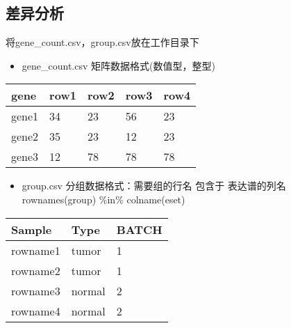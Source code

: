 \documentclass[
]{book}
\providecommand{\tightlist}{%
  \setlength{\itemsep}{0pt}\setlength{\parskip}{0pt}}
\begin{document}
\hypertarget{ux5deeux5f02ux5206ux6790}{%
\subsection{差异分析}\label{ux5deeux5f02ux5206ux6790}}

将gene\_count.csv，group.csv放在工作目录下

\begin{itemize}
\tightlist
\item
  gene\_count.csv 矩阵数据格式(数值型，整型)
\end{itemize}

\begin{longtable}[]{@{}lllll@{}}
\toprule\noalign{}
gene & row1 & row2 & row3 & row4 \\
\midrule\noalign{}
\endhead
\bottomrule\noalign{}
\endlastfoot
gene1 & 34 & 23 & 56 & 23 \\
gene2 & 35 & 23 & 12 & 23 \\
gene3 & 12 & 78 & 78 & 78 \\
\end{longtable}

\begin{itemize}
\tightlist
\item
  group.csv 分组数据格式：需要组的行名 包含于 表达谱的列名 rownames(group) \%in\% colname(eset)
\end{itemize}

\begin{longtable}[]{@{}lll@{}}
\toprule\noalign{}
Sample & Type & BATCH \\
\midrule\noalign{}
\endhead
\bottomrule\noalign{}
\endlastfoot
rowname1 & tumor & 1 \\
rowname2 & tumor & 1 \\
rowname3 & normal & 2 \\
rowname4 & normal & 2 \\
\end{longtable}
\end{document}
